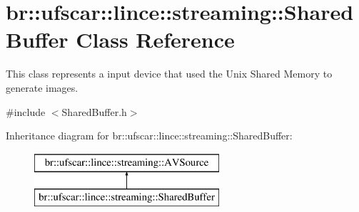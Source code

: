 \hypertarget{classbr_1_1ufscar_1_1lince_1_1streaming_1_1SharedBuffer}{
\section{br::ufscar::lince::streaming::SharedBuffer Class Reference}
\label{classbr_1_1ufscar_1_1lince_1_1streaming_1_1SharedBuffer}
}


This class represents a input device that used the Unix Shared Memory to generate images.  




{\ttfamily \#include $<$SharedBuffer.h$>$}

Inheritance diagram for br::ufscar::lince::streaming::SharedBuffer:\begin{figure}[H]
\begin{center}
\leavevmode
\includegraphics[height=2cm]{classbr_1_1ufscar_1_1lince_1_1streaming_1_1SharedBuffer}
\end{center}
\end{figure}
